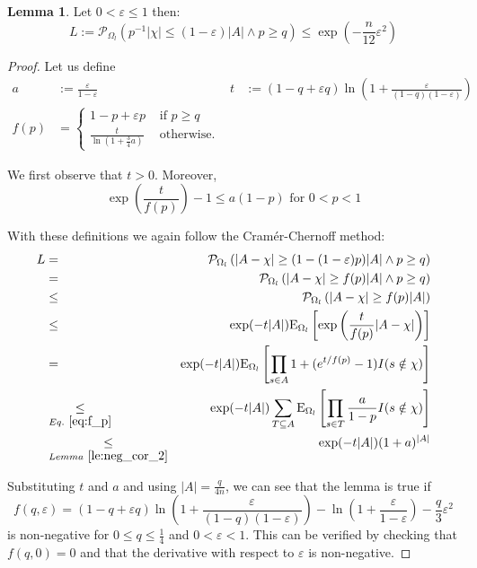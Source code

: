 \documentclass{article}
\newcommand{\prob}{\mathcal P}
\newcommand{\expectation}{\mathrm{E}}
\newcommand{\eps}{\varepsilon}
\theoremstyle{definition}
\newtheorem{lemma}{Lemma}
\begin{document}
\begin{lemma}\label{le:lower_tail}
Let $0 < \eps \leq 1$ then:
\[
  L := \prob_{\Omega_l} ( p^{-1} |\chi| \leq (1-\eps)|A| \wedge p \geq q) \leq \exp\left(-\frac{n}{12} \eps^2\right)
\]
\end{lemma}
\begin{proof}
Let us define
\begin{align*}
  a & := \frac{\eps}{1-\eps} &
  t & := (1-q+\eps q) \ln \left(1 + \frac{\eps}{(1-q)(1-\eps)} \right) \\
  f(p) & = \begin{cases} 1-p+\eps p & \textrm{ if } p \geq q \\ \frac{t}{\ln \left(1+\frac{3}{4}a\right)} & \textrm{ otherwise.} \end{cases}
\end{align*}

We first observe that $t > 0$. Moreover,
\begin{equation}\label{eq:f_p}
  \exp\left( \frac{t}{f(p)}\right)-1 \leq a (1-p) \textrm{ for } 0 < p < 1
\end{equation}

With these definitions we again follow the Cram\'{e}r-Chernoff method:
{\allowdisplaybreaks
\begin{eqnarray*}
  L & = & \prob_{\Omega_l} \left( |A-\chi| \geq (1-(1-\eps)p) |A| \wedge p \geq q \right) \\
    & = & \prob_{\Omega_l} \left( |A-\chi| \geq f(p)|A| \wedge p \geq q \right) \\
    & \leq & \prob_{\Omega_l} \left( |A-\chi| \geq f(p)|A| \right)  \\
    & \leq & \exp( -t |A| ) \expectation_{\Omega_l} \left[ \exp \left( \frac{t}{f(p)} |A-\chi| \right) \right] \\
    & = & \exp( -t |A| ) \expectation_{\Omega_l} \left[ \prod_{s \in A} 1 + (e^{t/f(p)} - 1) I(s \notin \chi) \right] \\
    & \underset{Eq.~\ref{eq:f_p}}{\leq}  & \exp( -t |A| ) \sum_{T \subseteq A} \expectation_{\Omega_l} \left[ \prod_{s \in T} \frac{a}{1-p} I(s \notin \chi) \right] \\
    & \underset{Lemma~\ref{le:neg_cor_2}}{\leq} & \exp( -t |A| ) (1+a)^{|A|}
\end{eqnarray*}
}

Substituting $t$ and $a$ and using $|A| = \frac{q}{4n}$, we can see that the lemma is true if
\[
  f(q,\eps) = (1-q+\eps q) \ln\left(1+\frac{\eps}{(1-q)(1-\eps)}\right) - \ln\left(1+\frac{\eps}{1-\eps}\right) - \frac{q}{3} \eps^2
\]
is non-negative for $0 \leq q \leq \frac{1}{4}$ and $0 < \eps < 1$.
This can be verified by checking that $f(q,0) = 0$ and that the derivative with respect to $\eps$ is non-negative.
\end{proof}
\end{document}
